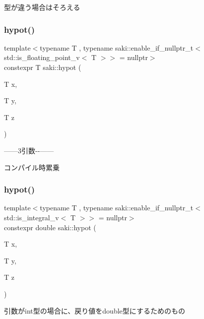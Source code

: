 型が違う場合はそろえる 

\mbox{\label{namespacesaki_a56768ecf1270205a8c9b3ac8cdf4a590}} 
\subsubsection{\texorpdfstring{hypot()}{hypot()}\hspace{0.1cm}{\footnotesize\ttfamily [4/6]}}
{\footnotesize\ttfamily template$<$typename T , typename saki\+::enable\+\_\+if\+\_\+nullptr\+\_\+t$<$ std\+::is\+\_\+floating\+\_\+point\+\_\+v$<$ T $>$$>$  = nullptr$>$ \\
constexpr T saki\+::hypot (\begin{DoxyParamCaption}\item[{T}]{x,  }\item[{T}]{y,  }\item[{T}]{z }\end{DoxyParamCaption})}



------3引数-\/-\/------ 

コンパイル時累乗 \mbox{\label{namespacesaki_ad56e1232bb063b3bc0e7cf2b3f655247}} 
\subsubsection{\texorpdfstring{hypot()}{hypot()}\hspace{0.1cm}{\footnotesize\ttfamily [5/6]}}
{\footnotesize\ttfamily template$<$typename T , typename saki\+::enable\+\_\+if\+\_\+nullptr\+\_\+t$<$ std\+::is\+\_\+integral\+\_\+v$<$ T $>$$>$  = nullptr$>$ \\
constexpr double saki\+::hypot (\begin{DoxyParamCaption}\item[{T}]{x,  }\item[{T}]{y,  }\item[{T}]{z }\end{DoxyParamCaption})}



引数がint型の場合に、戻り値をdouble型にするためのもの 

\mbox{\label{namespacesaki_ada6f15bbf909992e4840325c0dae0c42}} 
